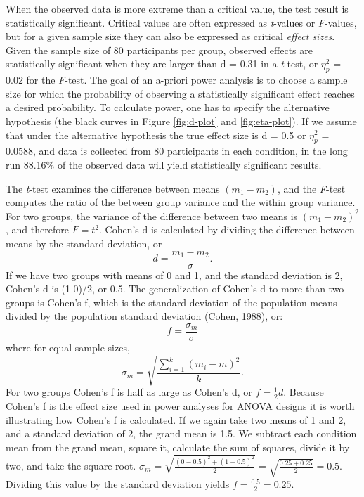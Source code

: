 \documentclass[,jou,floatsintext]{apa6}
\begin{document}
When the observed data is more extreme than a critical value, the test result is statistically significant.
Critical values are often expressed as \emph{t}-values or \emph{F}-values, but for a given sample size they can also be expressed as critical \emph{effect sizes}.
Given the sample size of 80 participants per group, observed effects are statistically significant when they are larger than d = 0.31 in a \emph{t}-test, or \(\eta_p^2\) = 0.02 for the \emph{F}-test.
The goal of an a-priori power analysis is to choose a sample size for which the probability of observing a statistically significant effect reaches a desired probability.
To calculate power, one has to specify the alternative hypothesis (the black curves in Figure \ref{fig:d-plot} and \ref{fig:eta-plot}).
If we assume that under the alternative hypothesis the true effect size is d = 0.5 or \(\eta_p^2\) = 0.0588, and data is collected from 80 participants in each condition, in the long run 88.16\% of the observed data will yield statistically significant results.

The \emph{t}-test examines the difference between means \((m_1 - m_2)\), and the \emph{F}-test computes the ratio of the between group variance and the within group variance.
For two groups, the variance of the difference between two means is \((m_1 - m_2)^2\), and therefore \(F = t^2\).
Cohen's d is calculated by dividing the difference between means by the standard deviation, or
\begin{equation}
d = \frac{m_1-m_2}{\sigma}.
\end{equation}
If we have two groups with means of 0 and 1, and the standard deviation is 2, Cohen's d is (1-0)/2, or 0.5.
The generalization of Cohen's d to more than two groups is Cohen's f, which is the standard deviation of the population means divided by the population standard deviation (Cohen, 1988), or:
\begin{equation}
f = \frac{\sigma _{ m }}{\sigma}
\end{equation}
where for equal sample sizes,
\begin{equation}
\sigma _{ m } = \sqrt { \frac { \sum_ { i = 1 } ^ { k } ( m _ { i } - m ) ^ { 2 } } { k } }.
\end{equation}
For two groups Cohen's f is half as large as Cohen's d, or \(f = \frac{1}{2}d\).
Because Cohen's f is the effect size used in power analyses for ANOVA designs it is worth illustrating how Cohen's f is calculated.
If we again take two means of 1 and 2, and a standard deviation of 2, the grand mean is 1.5.
We subtract each condition mean from the grand mean, square it, calculate the sum of squares, divide it by two, and take the square root.
\(\sigma_m = \sqrt{\frac{(0-0.5)^2+(1-0.5)^2}{2}} = \sqrt{\frac{0.25+0.25}{2}} = 0.5\).
Dividing this value by the standard deviation yields \(f = \frac{0.5}{2} = 0.25.\)
\end{document}
